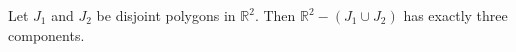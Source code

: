 Let $J_1$ and $J_2$ be disjoint polygons in $\mathbb{R}^2$. Then $\mathbb{R}^2 - (J_1 \cup J_2)$ has exactly three components.
